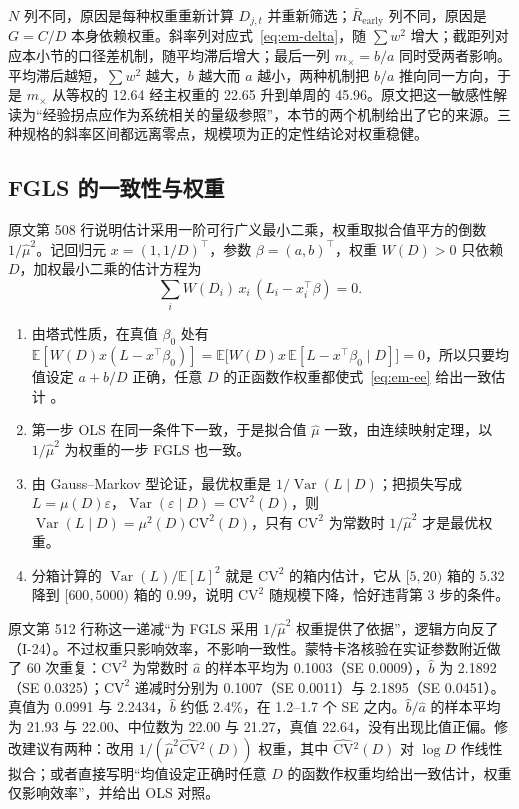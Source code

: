 $N$ 列不同，原因是每种权重重新计算 $D_{j,t}$ 并重新筛选；$\bar R_{\mathrm{early}}$ 列不同，原因是 $G=C/D$ 本身依赖权重。斜率列对应式~\ref{eq:em-delta}，随 $\sum w^2$ 增大；截距列对应本小节的口径差机制，随平均滞后增大；最后一列 $m_\times=b/a$ 同时受两者影响。平均滞后越短，$\sum w^2$ 越大，$b$ 越大而 $a$ 越小，两种机制把 $b/a$ 推向同一方向，于是 $m_\times$ 从等权的 12.64 经主权重的 22.65 升到单周的 45.96。原文把这一敏感性解读为“经验拐点应作为系统相关的量级参照”，本节的两个机制给出了它的来源。三种规格的斜率区间都远离零点，规模项为正的定性结论对权重稳健。

\subsection{FGLS 的一致性与权重}\label{sec:em-fgls}

原文第 508 行说明估计采用一阶可行广义最小二乘，权重取拟合值平方的倒数 $1/\hat\mu^2$。记回归元 $x=(1,1/D)^\top$，参数 $\beta=(a,b)^\top$，权重 $W(D)>0$ 只依赖 $D$，加权最小二乘的估计方程为
\begin{equation}\label{eq:em-ee}
\sum_i W(D_i)\,x_i\,(L_i-x_i^\top\beta)=0 .
\end{equation}
\begin{enumerate}
\item 由塔式性质，在真值 $\beta_0$ 处有 $\mathbb{E}[W(D)x(L-x^\top\beta_0)]=\mathbb{E}\big[W(D)x\,\mathbb{E}[L-x^\top\beta_0\mid D]\big]=0$，所以只要均值设定 $a+b/D$ 正确，任意 $D$ 的正函数作权重都使式~\ref{eq:em-ee} 给出一致估计 \citep{wooldridge2010econometric}。
\item 第一步 OLS 在同一条件下一致，于是拟合值 $\hat\mu$ 一致，由连续映射定理，以 $1/\hat\mu^2$ 为权重的一步 FGLS 也一致。
\item 由 Gauss--Markov 型论证，最优权重是 $1/\operatorname{Var}(L\mid D)$；把损失写成 $L=\mu(D)\varepsilon$，$\operatorname{Var}(\varepsilon\mid D)=\mathrm{CV}^2(D)$，则 $\operatorname{Var}(L\mid D)=\mu^2(D)\mathrm{CV}^2(D)$，只有 $\mathrm{CV}^2$ 为常数时 $1/\hat\mu^2$ 才是最优权重。
\item 分箱计算的 $\operatorname{Var}(L)/\mathbb{E}[L]^2$ 就是 $\mathrm{CV}^2$ 的箱内估计，它从 $[5,20)$ 箱的 5.32 降到 $[600,5000)$ 箱的 0.99，说明 $\mathrm{CV}^2$ 随规模下降，恰好违背第 3 步的条件。
\end{enumerate}
原文第 512 行称这一递减“为 FGLS 采用 $1/\hat\mu^2$ 权重提供了依据”，逻辑方向反了（I-24）。不过权重只影响效率，不影响一致性。蒙特卡洛核验在实证参数附近做了 60 次重复：$\mathrm{CV}^2$ 为常数时 $\hat a$ 的样本平均为 0.1003（SE 0.0009），$\hat b$ 为 2.1892（SE 0.0325）；$\mathrm{CV}^2$ 递减时分别为 0.1007（SE 0.0011）与 2.1895（SE 0.0451）。真值为 0.0991 与 2.2434，$\hat b$ 约低 2.4\%，在 1.2--1.7 个 SE 之内。$\hat b/\hat a$ 的样本平均为 21.93 与 22.00、中位数为 22.00 与 21.27，真值 22.64，没有出现比值正偏。修改建议有两种：改用 $1/(\hat\mu^2\widehat{\mathrm{CV}}{}^2(D))$ 权重，其中 $\widehat{\mathrm{CV}}{}^2(D)$ 对 $\log D$ 作线性拟合；或者直接写明“均值设定正确时任意 $D$ 的函数作权重均给出一致估计，权重仅影响效率”，并给出 OLS 对照。

